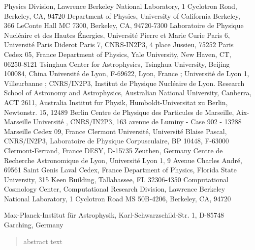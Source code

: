 \documentclass{aastex}   	%
\begin{document}
{
    Physics Division, Lawrence Berkeley National Laboratory, 
    1 Cyclotron Road, Berkeley, CA, 94720
}
{
    Department of Physics, University of California Berkeley,
    366 LeConte Hall MC 7300, Berkeley, CA, 94720-7300
}
{
    Laboratoire de Physique Nucl\'eaire et des Hautes \'Energies,
    Universit\'e Pierre et Marie Curie Paris 6, Universit\'e Paris Diderot Paris 7, CNRS-IN2P3, 
    4 place Jussieu, 75252 Paris Cedex 05, France
}
{
    Department of Physics, Yale University, 
    New Haven, CT, 06250-8121
}
{
    Tsinghua Center for Astrophysics, Tsinghua University, Beijing 100084, China 
}
{
    Universit\'e de Lyon, F-69622, Lyon, France ; Universit\'e de Lyon 1, Villeurbanne ; 
    CNRS/IN2P3, Institut de Physique Nucl\'eaire de Lyon.
}
{
    Research School of Astronomy and Astrophysics,
    Australian National University,
    Canberra, ACT 2611, Australia
}
{
    Institut fur Physik,  Humboldt-Universitat zu Berlin,
    Newtonstr. 15, 12489 Berlin
}
{
    Centre de Physique des Particules de Marseille, 
    Aix-Marseille Universit\'e , CNRS/IN2P3, 
    163 avenue de Luminy - Case 902 - 13288 Marseille Cedex 09, France
}
{
    Clermont Universit\'e, Universit\'e Blaise Pascal, CNRS/IN2P3, Laboratoire de Physique Corpusculaire,
    BP 10448, F-63000 Clermont-Ferrand, France
}
{
    DESY, D-15735 Zeuthen, Germany
}
{
    Centre de Recherche Astronomique de Lyon, Universit\'e Lyon 1,
    9 Avenue Charles Andr\'e, 69561 Saint Genis Laval Cedex, France
}
{
    Department of Physics, Florida State University,
    315 Keen Building, Tallahassee, FL 32306-4350
}
{
    Computational Cosmology Center, Computational Research Division, Lawrence Berkeley National Laboratory, 
    1 Cyclotron Road MS 50B-4206, Berkeley, CA, 94720
}

{
    Max-Planck-Institut f\"ur Astrophysik, Karl-Schwarzschild-Str. 1,
D-85748 Garching, Germany
}

\begin{abstract}
abstract text
\end{abstract}

\end{document}

